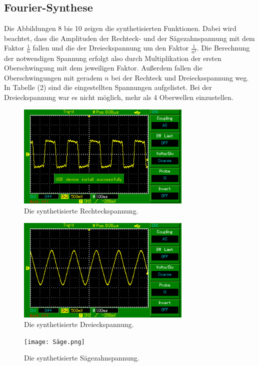 \subsection{Fourier-Synthese}
Die Abbildungen 8 bis 10 zeigen die synthetisierten Funktionen. Dabei wird beachtet,
dass die Amplituden der Rechteck- und der Sägezahnspannung mit dem Faktor $\frac{1}{n}$ fallen
und die der Dreieckspannung um den Faktor $\frac{1}{n^2}$. Die Berechnung der notwendigen Spannung erfolgt also durch
Multiplikation der ersten Oberschwingung mit dem jeweiligen Faktor.
Außerdem fallen die Oberschwingungen mit geradem $n$
bei der Rechteck und Dreiecksspannung weg. In Tabelle (2) sind die eingestellten Spannungen aufgelistet.
Bei der Dreieckspannung war es nicht möglich, mehr als 4 Oberwellen einzustellen.
\begin{figure}
  \centering
  \includegraphics[height=5cm]{rechteck.png}
  \caption{Die synthetisierte Rechteckspannung.}
  \label{fig:rechteck}
\end{figure}
\begin{figure}
  \centering
  \includegraphics[height=5cm]{Dreieck.png}
  \caption{Die synthetisierte Dreieckspannung.}
  \label{fig:rechteck}
\end{figure}
\begin{figure}
  \centering
  \texttt{[image: Säge.png]}
  \caption{Die synthetisierte Sägezahnspannung.}
  \label{fig:rechteck}
\end{figure}



